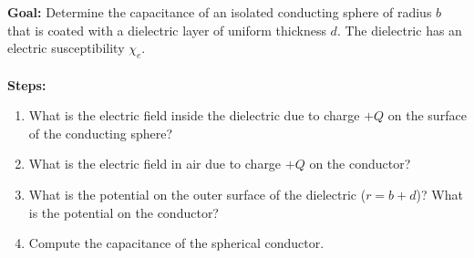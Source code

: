 \documentclass[../../header.tex]{subfiles}
\begin{document}
\textbf{Goal:} Determine the capacitance of an isolated conducting sphere of radius $b$ that is coated with a dielectric layer of uniform thickness $d$. The dielectric has an electric susceptibility $\chi_e$.\\
\\
\textbf{Steps:} 
\begin{enumerate}
\item What is the electric field inside the dielectric due to charge $+Q$ on the surface of the conducting sphere?


\item What is the electric field in air due to charge $+Q$ on the conductor?\\


\item What is the potential on the outer surface of the dielectric ($r = b+d$)? What is the potential on the conductor?


\item Compute the capacitance of the spherical conductor.

\end{enumerate}
\end{document}
